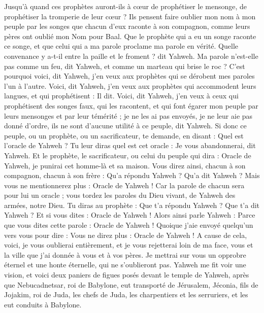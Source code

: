 \begin{multicols}{2}
Jusqu'à quand ces prophètes auront-ils à cœur de prophétiser le mensonge, de prophétiser la tromperie de leur cœur ?
Ils pensent faire oublier mon nom à mon peuple par les songes que chacun d'eux raconte à son compagnon, comme leurs pères ont oublié mon Nom pour Baal.
Que le prophète qui a eu un songe raconte ce songe, et que celui qui a ma parole proclame ma parole en vérité. Quelle convenance y a-t-il entre la paille et le froment ? dit Yahweh.
Ma parole n'est-elle pas comme un feu, dit Yahweh, et comme un marteau qui brise le roc ?
C'est pourquoi voici, dit Yahweh, j'en veux aux prophètes qui se dérobent mes paroles l'un à l'autre.
Voici, dit Yahweh, j'en veux aux prophètes qui accommodent leurs langues, et qui prophétisent : Il dit.
Voici, dit Yahweh, j'en veux à ceux qui prophétisent des songes faux, qui les racontent, et qui font égarer mon peuple par leurs mensonges et par leur témérité ; je ne les ai pas envoyés, je ne leur aie pas donné d'ordre, ils ne sont d'aucune utilité à ce peuple, dit Yahweh.
Si donc ce peuple, ou un prophète, ou un sacrificateur, te demande, en disant : Quel est l'oracle de Yahweh ? Tu leur diras quel est cet oracle : Je vous abandonnerai, dit Yahweh.
Et le prophète, le sacrificateur, ou celui du peuple qui dira : Oracle de Yahweh, je punirai cet homme-là et sa maison.
Vous direz ainsi, chacun à son compagnon, chacun à son frère : Qu'a répondu Yahweh ? Qu'a dit Yahweh ?
Mais vous ne mentionnerez plus : Oracle de Yahweh ! Car la parole de chacun sera pour lui un oracle ; vous tordez les paroles du Dieu vivant, de Yahweh des armées, notre Dieu.
Tu diras au prophète : Que t'a répondu Yahweh ? Que t'a dit Yahweh ?
Et si vous dites : Oracle de Yahweh ! Alors ainsi parle Yahweh : Parce que vous dites cette parole : Oracle de Yahweh ! Quoique j'aie envoyé quelqu'un vers vous pour dire : Vous ne direz plus : Oracle de Yahweh !
A cause de cela, voici, je vous oublierai entièrement, et je vous rejetterai loin de ma face, vous et la ville que j'ai donnée à vous et à vos pères.
Je mettrai sur vous un opprobre éternel et une honte éternelle, qui ne s'oublieront pas.
\VerseOne{}Yahweh me fit voir une vision, et voici deux paniers de figues posés devant le temple de Yahweh, après que Nebucadnetsar, roi de Babylone, eut transporté de Jérusalem, Jéconia, fils de Jojakim, roi de Juda, les chefs de Juda, les charpentiers et les serruriers, et les eut conduits à Babylone.

\end{multicols}

